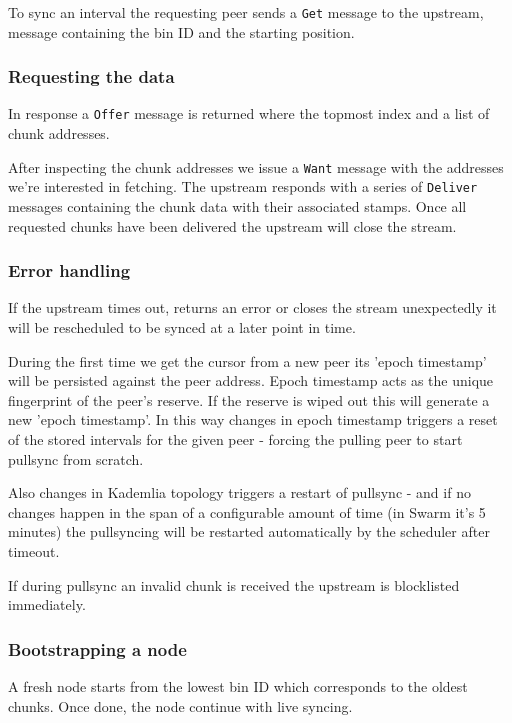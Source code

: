 To sync an interval the requesting peer sends a \texttt{Get} message to the upstream, message containing the bin ID and the starting position.

\subsubsection{Requesting the data}\label{requesting-the-data}

In response a \texttt{Offer} message is returned where the topmost index and a list of chunk addresses.

After inspecting the chunk addresses we issue a \texttt{Want} message
with the addresses we're interested in fetching. The upstream responds
with a series of \texttt{Deliver} messages containing the chunk data
with their associated stamps. Once all requested chunks have been
delivered the upstream will close the stream.

\subsubsection{Error handling}\label{error-handling}

If the upstream times out, returns an error or closes the stream unexpectedly it will be rescheduled to be synced at a later point in time.

During the first time we get the cursor from a new peer its 'epoch timestamp' will be persisted against the peer address.
Epoch timestamp acts as the unique fingerprint of the peer's reserve. If the reserve is wiped out this will generate a new 'epoch timestamp'.
In this way changes in epoch timestamp triggers a reset of the stored intervals for the given peer - forcing the pulling peer to start pullsync from scratch.

Also changes in Kademlia topology triggers a restart of pullsync - and if no changes happen in the span of a configurable amount of time (in Swarm it's 5 minutes) the pullsyncing will be restarted automatically by the scheduler after timeout.

If during pullsync an invalid chunk is received the upstream is blocklisted immediately.

\subsubsection{Bootstrapping a node}\label{bootstrapping-a-node}

A fresh node starts from the lowest bin ID which corresponds to the
oldest chunks. Once done, the node continue with live syncing.

